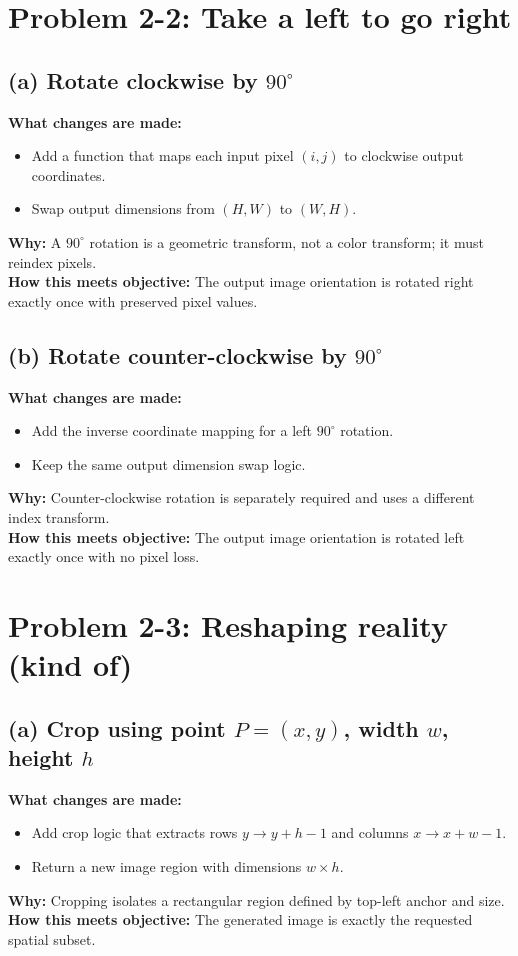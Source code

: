 \documentclass[11pt]{article}
\begin{document}
\section*{Problem 2-2: Take a left to go right}
\subsection*{(a) Rotate clockwise by \(90^\circ\)}
\textbf{What changes are made:}
\begin{itemize}[leftmargin=1.2em]
    \item Add a function that maps each input pixel \((i,j)\) to clockwise output coordinates.
    \item Swap output dimensions from \((H,W)\) to \((W,H)\).
\end{itemize}
\textbf{Why:} A \(90^\circ\) rotation is a geometric transform, not a color transform; it must reindex pixels.\\
\textbf{How this meets objective:} The output image orientation is rotated right exactly once with preserved pixel values.

\subsection*{(b) Rotate counter-clockwise by \(90^\circ\)}
\textbf{What changes are made:}
\begin{itemize}[leftmargin=1.2em]
    \item Add the inverse coordinate mapping for a left \(90^\circ\) rotation.
    \item Keep the same output dimension swap logic.
\end{itemize}
\textbf{Why:} Counter-clockwise rotation is separately required and uses a different index transform.\\
\textbf{How this meets objective:} The output image orientation is rotated left exactly once with no pixel loss.

\section*{Problem 2-3: Reshaping reality (kind of)}
\subsection*{(a) Crop using point \(P=(x,y)\), width \(w\), height \(h\)}
\textbf{What changes are made:}
\begin{itemize}[leftmargin=1.2em]
    \item Add crop logic that extracts rows \(y \rightarrow y+h-1\) and columns \(x \rightarrow x+w-1\).
    \item Return a new image region with dimensions \(w \times h\).
\end{itemize}
\textbf{Why:} Cropping isolates a rectangular region defined by top-left anchor and size.\\
\textbf{How this meets objective:} The generated image is exactly the requested spatial subset.
\end{document}
